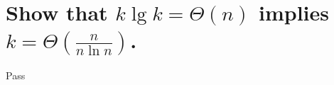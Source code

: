 \section[Problem 3]{Show that $k \lg k = \Theta(n)$ implies $k = \Theta\left(\frac{n}{n \ln n}\right)$.}
Pass

